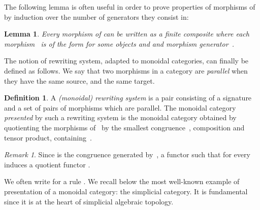 \documentclass[submission,copyright,creativecommons]{eptcs}
\newtheorem{lemma}[theorem]{Lemma}
\theoremstyle{definition}
\newtheorem{definition}[theorem]{Definition}
\theoremstyle{remark}
\newtheorem{remark}[theorem]{Remark}
\begin{document}
\noindent
The following lemma is often useful in order to prove properties of morphisms of
 by induction over the number of generators they consist in:

\begin{lemma}
  \label{lemma:free-moncat-slice}
  Every morphism  of  can be written as a finite composite
   where each morphism~ is of the form
   for some objects  and
   and morphism generator~.
\end{lemma}

The notion of rewriting system, adapted to monoidal categories, can finally be
defined as follows. We say that two morphisms in a category are \emph{parallel}
when they have the same source, and the same target.

\begin{definition}
  A \emph{(monoidal) rewriting system} is a pair  consisting of a
  signature  and a set  of
  pairs of morphisms which are parallel. The monoidal category \emph{presented}
  by such a rewriting system is the monoidal category 
  obtained by quotienting the morphisms of~ by the smallest
  congruence~, \wrt composition and tensor product, containing~.
\end{definition}

\begin{remark}
  \label{rem:free-moncat-rel}
  Since  is the congruence generated by~, a functor
   such that  for every  induces a
  quotient functor .
\end{remark}

\noindent
We often write  for a rule . We recall
below the most well-known example of presentation of a monoidal category: the
simplicial category. It is fundamental since it is at the heart of simplicial
algebraic topology.
\end{document}
